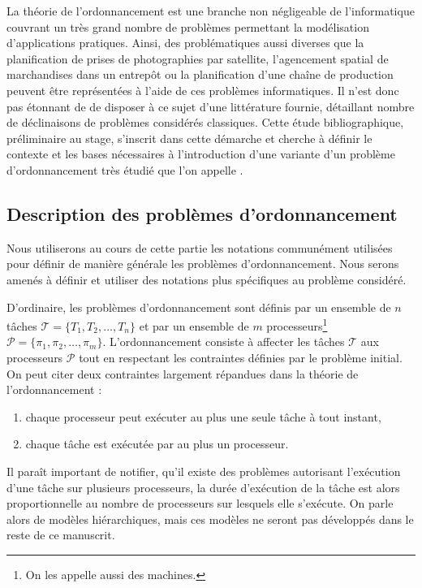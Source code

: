La théorie de l'ordonnancement est une branche non négligeable de l'informatique couvrant un très
grand nombre de problèmes permettant la modélisation d'applications pratiques. Ainsi, des
problématiques aussi diverses que la planification de prises de photographies par satellite,
l'agencement spatial de marchandises dans un entrepôt ou la planification d'une chaîne de production
peuvent être représentées à l'aide de ces problèmes informatiques. Il n'est donc pas étonnant de
de disposer à ce sujet d'une littérature fournie, détaillant nombre de déclinaisons de problèmes
considérés classiques. Cette étude bibliographique, préliminaire au stage, s'inscrit dans cette
démarche et cherche à définir le contexte et les bases nécessaires à l'introduction d'une variante
d'un problème d'ordonnancement très étudié que l'on appelle \isched.

\subsection{Description des problèmes d'ordonnancement}

Nous utiliserons au cours de cette partie les notations communément utilisées pour définir de
manière générale les problèmes d'ordonnancement. Nous serons amenés à définir et utiliser des
notations plus spécifiques au problème considéré.

D'ordinaire, les problèmes d'ordonnancement sont définis par un ensemble de $n$ tâches $\mathcal{T} =
\{T_1, T_2, \dots, T_n\}$ et par un ensemble de $m$ processeurs\footnote{On les appelle aussi des
machines.} $\mathcal{P} = \{\pi_1, \pi_2, \dots, \pi_m\}$. L'ordonnancement consiste à affecter les
tâches $\mathcal{T}$ aux processeurs $\mathcal{P}$ tout en respectant les contraintes définies par
le problème initial. On peut citer deux contraintes largement répandues dans la théorie de
l'ordonnancement :
\begin{enumerate}
    \item chaque processeur peut exécuter au plus une seule tâche à tout instant,
    \item chaque tâche est exécutée par au plus un processeur.
\end{enumerate}

Il paraît important de notifier, qu'il existe des problèmes autorisant l'exécution d'une tâche sur
plusieurs processeurs, la durée d'exécution de la tâche est alors proportionnelle au nombre de
processeurs sur lesquels elle s'exécute. On parle alors de modèles hiérarchiques, mais ces modèles
ne seront pas développés dans le reste de ce manuscrit.

